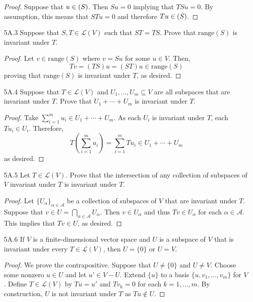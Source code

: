 \documentclass{article}
\newcommand{\sq}{\subseteq}
\newcommand{\scr}{\mathscr}
\newcommand{\range}{\mathrm{range}}
\theoremstyle{definition}
\begin{document}
\begin{proof}
Suppose that $u \in \null(S)$. Then $S u = 0$ implying that $TS u = 0$. By assumption, this means that $STu = 0$ and therefore $Tu \in \null(S)$.
\end{proof}

\begin{LA}{5A.3}{}
Suppose that $S,T \in \scr{L}(V)$ such that $ST = TS$. Prove that $\range(S)$ is invariant under $T$.
\end{LA}

\begin{proof}
Let $v \in \range(S)$ where $v = Su$ for some $u \in V$. Then,
	\[Tv = (TS) u = (ST)u \in \range(S) \]
proving that $\range(S)$ is invariant under $T$, as desired.
\end{proof}

\begin{LA}{5A.4}{}
Suppose that $T \in \scr{L}(V)$ and $U_1, \ldots, U_m \sq V$ are all subspaces that are invariant under $T$. Prove that $U_1 + \cdots + U_m$ is invariant under $T$.
\end{LA}

\begin{proof}
Take $\sum_{i=1}^m u_i \in U_1 + \cdots + U_m$. As each $U_i$ is invariant under $T$, each $Tu_i \in U_i$. Therefore,
	\[T\left(\sum_{i=1}^m u_i\right) = \sum_{i=1}^m Tu_i \in U_1 + \cdots + U_m \]
as desired.
\end{proof}

\begin{LA}{5A.5}{}
Let $T \in \scr{L}(V)$. Prove that the intersection of any collection of subspaces of $V$ invariant under $T$ is invariant under $T$.
\end{LA}

\begin{proof}
Let $\{U_\alpha\}_{\alpha \in \scr{A}}$ be a collection of subspaces of $V$ that are invariant under $T$. Suppose that $v \in U = \bigcap_{\alpha \in \scr{A}} U_\alpha$. Then $v \in U_\alpha$ and thus $Tv \in U_\alpha$ for each $\alpha \in \scr{A}$. This implies that $Tv \in U$, as desired.
\end{proof}

\begin{LA}{5A.6}{}
If $V$ is a finite-dimensional vector space and $U$ is a subspace of $V$ that is invariant under every $T \in \scr{L}(V)$, then $U = \{0\}$ or $U = V$.
\end{LA}

\begin{proof}
We prove the contrapositive. Suppose that $U \neq \{0\}$ and $U \neq V$. Choose some nonzero $u \in U$ and let $u' \in V - U$. Extend $\{u\}$ to a basis $\{u, v_1, \ldots, v_m \}$ for $V$. Define $T \in \scr{L}(V)$ by $Tu = u'$ and $Tv_k = 0$ for each $k = 1, \ldots, m$. By construction, $U$ is not invariant under $T$ as $Tu \not\in U$.
\end{proof}
\end{document}
